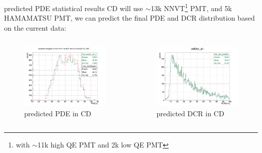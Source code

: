 \documentclass[11pt,compress,xcolor=x11names,UTF8]{beamer}
\begin{document}
\begin{frame}{predicted PDE statistical results}
CD will use $\sim$13k NNVT\footnote{with $\sim$11k high QE PMT and 2k low QE PMT} PMT, and 5k HAMAMATSU PMT, we can predict the final PDE and DCR distribution based on the current data:
\begin{columns}
\begin{column}{.5\textwidth}
\begin{figure}
\centering
\includegraphics[width=\textwidth]{figures/sim.png} %
\caption{predicted PDE in CD}
\end{figure}
\end{column}
\begin{column}{.5\textwidth}
\begin{figure}
\centering
\includegraphics[width=\textwidth]{figures/dcr_p.png} %
\caption{predicted DCR in CD}
\end{figure}
\end{column}
\end{columns}
\end{frame}
\end{document}
